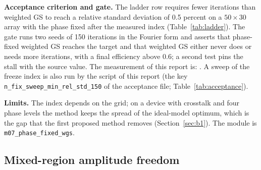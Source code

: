 \textbf{Acceptance criterion and gate.} The ladder row requires fewer iterations than weighted GS to reach a relative standard deviation of 0.5 percent on a $50\times30$ array with the phase fixed after the measured index (Table~\ref{tab:ladder}). The gate runs two seeds of 150 iterations in the Fourier form and asserts that phase-fixed weighted GS reaches the target and that weighted GS either never does or needs more iterations, with a final efficiency above 0.6; a second test pins the stall with the source value. The measurement of this report is: . A sweep of the freeze index is also run by the script of this report (the key \texttt{n\_fix\_sweep\_min\_rel\_std\_150} of the acceptance file; Table~\ref{tab:acceptance}).

\textbf{Limits.} The index depends on the grid; on a device with crosstalk and four phase levels the method keeps the spread of the ideal-model optimum, which is the gap that the first proposed method removes (Section~\ref{sec:b1}). The module is \texttt{m07\_phase\_fixed\_wgs}.

\subsection{Mixed-region amplitude freedom}\label{sec:m08}


